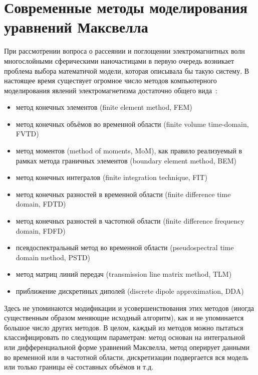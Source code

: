 \section{Современные методы моделирования уравнений Максвелла}
\label{sec:em-methods-intro}
При рассмотрении вопроса о рассеянии и поглощении электромагнитных
волн многослойными сферическими наночастицами в первую очередь
возникает проблема выбора математичой модели, которая описывала бы
такую систему.  В настоящее время существует огромное число методов
компьютерного моделирования явлений электромагнетизма достаточно
общего
вида~\cite{Yu-PFDTD-2006,Inan-FDTD-2011,clemson,Bondenson-CEM-2005,Yu-Advanced-FDTD-2011}:
\begin{itemize}
\item метод конечных элементов (finite element method, FEM)
\item метод конечных объёмов во временной области (finite volume
  time-domain, FVTD)
\item метод моментов (method of moments, MoM), как правило реализуемый
  в рамках метода граничных элементов (boundary element method, BEM)
\item метод конечных интегралов (finite integration technique, FIT)
\item метод конечных разностей в временной области (finite difference
  time domain, FDTD)
\item метод конечных разностей в частотной области (finite difference
  frequency domain, FDFD)
\item псевдоспектральный метод во временной области (pseudospectral
  time domain method, PSTD)
\item метод матриц линий передач (transmission line matrix method,
  TLM)
\item приближение дискретиных диполей (discrete dipole approximation, DDA)
\end{itemize}
Здесь не упоминаются модификации и усовершенствования этих методов
(иногда существенным образом меняющие исходный алгоритм), как и не
упоминается большое число других методов.  В целом, каждый из методов
можно пытаться классифицировать по следующим параметрам: метод основан
на интегральной или дифференциальной форме уравнений Максвелла, метод
оперирует данными во временной или в частотной области, дискретизации
подвергается вся модель или только границы её составных объёмов и т.д.

